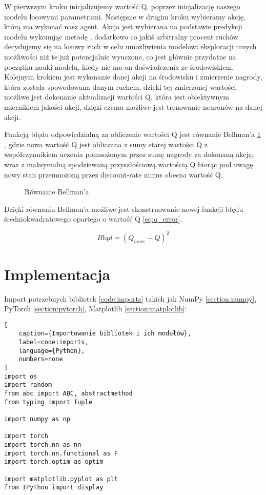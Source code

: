 W pierwszym kroku inicjalizujemy wartość Q, poprzez inicjalizację naszego modelu losowymi parametrami. Następnie w drugim kroku wybieramy akcję, którą ma wykonać nasz agent. Akcja jest wybierana na podstawie predykcji modelu wykonując metodę , dodatkowo co jakiś arbitralny procent ruchów decydujemy się na losowy ruch w celu umożliwienia modelowi eksploracji innych możliwości niż te już potencjalnie wyuczone, co jest głównie przydatne na początku nauki modelu, kiedy nie ma on doświadczenia ze środowiskiem. Kolejnym krokiem jest wykonanie danej akcji na środowisku i zmierzenie nagrody, która została spowodowana danym ruchem, dzięki tej zmierzonej wartości możliwe jest dokonanie aktualizacji wartości Q, która jest obiektywnym miernikiem jakości akcji, dzięki czemu możliwe jest trenowanie neuronów na danej akcji.

Funkcją błędu odpowiedzialną za obliczenie wartości Q jest równanie Bellman'a \ref{img:bellman_eq} \cite{BellmanEquation}, gdzie nowa wartość Q jest obliczana z sumy starej wartości Q z współczynnikiem uczenia pomnożonym przez sumę nagrody za dokonaną akcję, wraz z maksymalną spodziewaną przyszłościową wartością Q biorąc pod uwagę nowy stan przemnożoną przez discount-rate minus obecna wartość Q.


\begin{figure}[h]
    \centering
    \caption{Równanie Bellman'a \cite{BellmanEquationPic}}
    \label{img:bellman_eq}
\end{figure}

Dzięki równaniu Bellman'a możliwe jest skonstruowanie nowej funkcji błędu średniokwadratowego \cite{BladSredniokwadratowy} opartego o wartość Q \ref{eq:q_error}.

\begin{equation}
    Błąd = (Q_{nowe} - Q)^{2}
    \label{eq:q_error}
\end{equation}

\clearpage

\section{Implementacja}

Import potrzebnych bibliotek \ref{code:imports} takich jak NumPy \ref{section:numpy}, PyTorch \ref{section:pytorch}, Matplotlib \ref{section:matplotlib}:

\begin{onepage}
    \begin{lstlisting}[
    caption={Importowanie bibliotek i ich modułów},
    label=code:imports,
    language={Python},
    numbers=none
]
import os
import random
from abc import ABC, abstractmethod
from typing import Tuple

import numpy as np

import torch
import torch.nn as nn
import torch.nn.functional as F
import torch.optim as optim

import matplotlib.pyplot as plt
from IPython import display
    \end{lstlisting}
\end{onepage}

